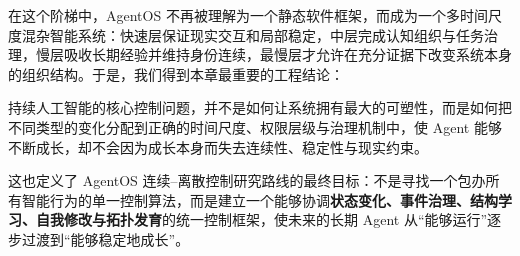 在这个阶梯中，AgentOS 不再被理解为一个静态软件框架，而成为一个多时间尺度混杂智能系统：快速层保证现实交互和局部稳定，中层完成认知组织与任务治理，慢层吸收长期经验并维持身份连续，最慢层才允许在充分证据下改变系统本身的组织结构。于是，我们得到本章最重要的工程结论：

\begin{conclusion}
持续人工智能的核心控制问题，并不是如何让系统拥有最大的可塑性，而是如何把不同类型的变化分配到正确的时间尺度、权限层级与治理机制中，使 Agent 能够不断成长，却不会因为成长本身而失去连续性、稳定性与现实约束。
\end{conclusion}

这也定义了 AgentOS 连续--离散控制研究路线的最终目标：不是寻找一个包办所有智能行为的单一控制算法，而是建立一个能够协调\textbf{状态变化、事件治理、结构学习、自我修改与拓扑发育}的统一控制框架，使未来的长期 Agent 从``能够运行''逐步过渡到``能够稳定地成长''。
